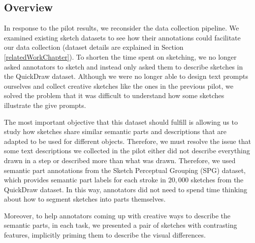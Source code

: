 
\subsection{Overview}
In response to the pilot results, we reconsider the data collection pipeline. 
We examined existing sketch datasets to see how their annotations could facilitate our data collection (dataset details are explained in Section \ref{relatedWorkChapter}).    
To shorten the time spent on sketching, we no longer asked annotators to sketch and instead only asked them to describe sketches in the QuickDraw dataset. Although we were no longer able to design text prompts ourselves and collect creative sketches like the ones in the previous pilot, we solved the problem that it was difficult to understand how some sketches illustrate the give prompts. 

The most important objective that this dataset should fulfill is allowing us to study how sketches share similar semantic parts and descriptions that are adapted to be used for different objects. Therefore, we must resolve the issue that some text descriptions we collected in the pilot either did not describe everything drawn in a step or described more than what was drawn.  
Therefore, we used semantic part annotations from the Sketch Perceptual Grouping (SPG) dataset, which provides semantic part labels for each stroke in $20,000$ sketches from the QuickDraw dataset. In this way, annotators did not need to spend time thinking about how to segment sketches into parts themselves. 

Moreover, to help annotators coming up with creative ways to describe the semantic parts, in each task, we presented a pair of sketches with contrasting features, implicitly priming them to describe the visual differences. 


